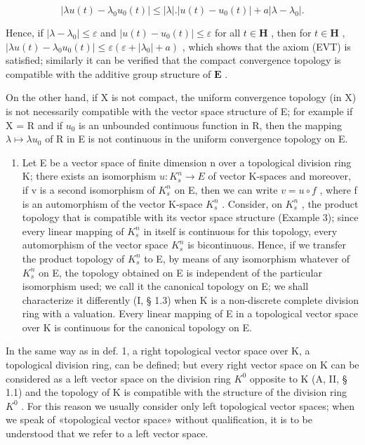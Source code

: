 \[
\left| \lambda u (t) - \lambda_ {0} u _ {0} (t) \right| \leqslant | \lambda |. \left| u (t) - u _ {0} (t) \right| + a \left| \lambda - \lambda_ {0} \right|.
\]

Hence, if \(|\lambda - \lambda_0| \leqslant \varepsilon\) and \(|u(t) - u_0(t)| \leqslant \varepsilon\) for all \(t \in \mathbf{H}\) , then for \(t \in \mathbf{H}\) , \(|\lambda u(t) - \lambda_0 u_0(t)| \leqslant \varepsilon (\varepsilon + |\lambda_0| + a)\) , which shows that the axiom (EVT) is satisfied; similarly it can be verified that the compact convergence topology is compatible with the additive group structure of \(\mathbf{E}\) .

On the other hand, if X is not compact, the uniform convergence topology (in X) is not necessarily compatible with the vector space structure of E; for example if X = R and if \(u_{0}\) is an unbounded continuous function in R, then the mapping \(\lambda \mapsto \lambda u_{0}\) of R in E is not continuous in the uniform convergence topology on E.

\begin{enumerate}
\def\labelenumi{\arabic{enumi})}
\setcounter{enumi}{4}
\tightlist
\item
  Let E be a vector space of finite dimension n over a topological division ring K; there exists an isomorphism \(u:K_{s}^{n}\to E\) of vector K-spaces and moreover, if v is a second isomorphism of \(K_{s}^{n}\) on E, then we can write \(v=u\circ f\) , where f is an automorphism of the vector K-space \(K_{s}^{n}\) . Consider, on \(K_{s}^{n}\) , the product topology that is compatible with its vector space structure (Example 3); since every linear mapping of \(K_{s}^{n}\) in itself is continuous for this topology, every automorphism of the vector space \(K_{s}^{n}\) is bicontinuous. Hence, if we transfer the product topology of \(K_{s}^{n}\) to E, by means of any isomorphism whatever of \(K_{s}^{n}\) on E, the topology obtained on E is independent of the particular isomorphism used; we call it the canonical topology on E; we shall characterize it differently (I, § 1.3) when K is a non-discrete complete division ring with a valuation. Every linear mapping of E in a topological vector space over K is continuous for the canonical topology on E.
\end{enumerate}

In the same way as in def. 1, a right topological vector space over K, a topological division ring, can be defined; but every right vector space on K can be considered as a left vector space on the division ring \(K^{0}\) opposite to K (A, II, § 1.1) and the topology of K is compatible with the structure of the division ring \(K^{0}\) . For this reason we usually consider only left topological vector spaces; when we speak of «topological vector space» without qualification, it is to be understood that we refer to a left vector space.

